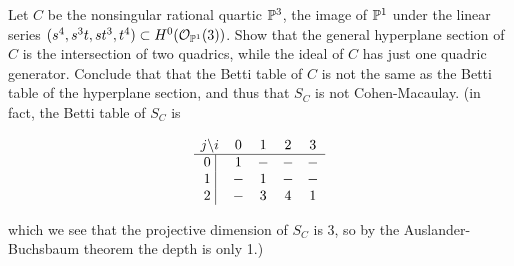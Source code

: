 \begin{exercise}
 Let $C$ be the nonsingular rational quartic ${\mathbb P}^{3}$, the image of ${\mathbb P}^{1}$ under the linear series
 $(s^{4}, s^{3}t, st^{3}, t^{4})\subset H^{0}({\mathcal O}_{{\mathbb P}^{1}}(3))$. Show that the general hyperplane section of $C$  is the intersection of two quadrics, while the ideal of $C$ has just one quadric generator. Conclude that
  that the Betti table of $C$ is not the same as the Betti table of the hyperplane section, and thus that
  $S_{C}$ is not Cohen-Macaulay. (in fact, the Betti table of $S_{C}$ is
\begin{small}
$$
\begin{matrix}
j \backslash i &0&1&2&3\\ \hline
\text{0 }\vline &1&-&-&-\\
\text{1 }\vline &-&1&-&-\\
\text{2 }\vline &-&3&4&1\\
\end{matrix}
$$
\end{small}
 which we see that the projective dimension of $S_{C}$ is 3, so by the Auslander-Buchsbaum theorem the depth is only 1.)
\end{exercise}

%

